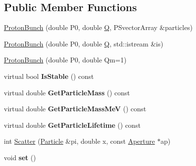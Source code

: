 \subsection*{Public Member Functions}
\begin{DoxyCompactItemize}
\item 
\hyperlink{classParticleTracking_1_1ProtonBunch_ac164c660786ace46b7062aaf55cdc892}{Proton\+Bunch} (double P0, double \hyperlink{namespaceParticleTracking_a3e89510a540596b235a808915deb0f7a}{Q}, P\+Svector\+Array \&particles)
\item 
\hyperlink{classParticleTracking_1_1ProtonBunch_a8995b06940ff513e9f0ccfaed64dddc8}{Proton\+Bunch} (double P0, double \hyperlink{namespaceParticleTracking_a3e89510a540596b235a808915deb0f7a}{Q}, std\+::istream \&is)
\item 
\hyperlink{classParticleTracking_1_1ProtonBunch_ab69b76eea9a4dc9416b9932a7f34903d}{Proton\+Bunch} (double P0, double Qm=1)
\item 
\mbox{\label{classParticleTracking_1_1ProtonBunch_ad5a81b30ed5f1adf21bc1e35c27e9a23}} 
virtual bool {\bfseries Is\+Stable} () const
\item 
\mbox{\label{classParticleTracking_1_1ProtonBunch_aea2c5de19c6fc0e3eadd51ce8dcf29c1}} 
virtual double {\bfseries Get\+Particle\+Mass} () const
\item 
\mbox{\label{classParticleTracking_1_1ProtonBunch_a55cde65d6cfafbbfae5f4a98871c20b7}} 
virtual double {\bfseries Get\+Particle\+Mass\+MeV} () const
\item 
\mbox{\label{classParticleTracking_1_1ProtonBunch_a0db63a19fa76f18b7a1a4378c3b79763}} 
virtual double {\bfseries Get\+Particle\+Lifetime} () const
\item 
int \hyperlink{classParticleTracking_1_1ProtonBunch_adca6b2edceb4186ed0c0b6cf0437cbae}{Scatter} (\hyperlink{classPSvector}{Particle} \&pi, double x, const \hyperlink{classAperture}{Aperture} $\ast$ap)
\item 
\mbox{\label{classParticleTracking_1_1ProtonBunch_a0dc10730820f3b14ef0d9ccda7407555}} 
void {\bfseries set} ()
\item 
\mbox{\label{classParticleTracking_1_1ProtonBunch_a16ebd4a742186ca3ab45b3ddeeaf8ad2}} 

\end{DoxyCompactItemize}
